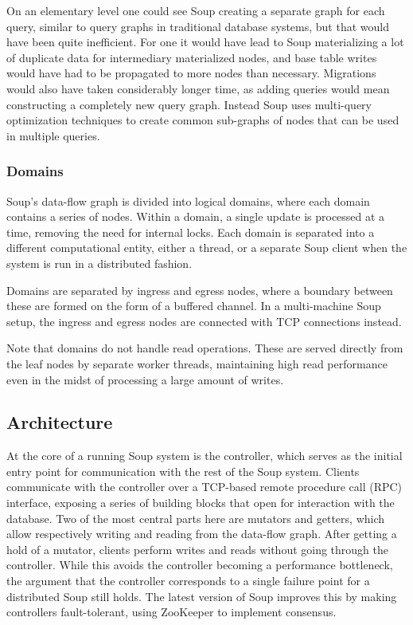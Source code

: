 \documentclass[b5paper]{report}
\begin{document}
On an elementary level one could see Soup creating a separate graph for each
query, similar to query graphs in traditional database systems, but that would
have been quite inefficient. For one it would have lead to Soup materializing a
lot of duplicate data for intermediary materialized nodes, and base table writes
would have had to be propagated to more nodes than necessary. Migrations would
also have taken considerably longer time, as adding queries would mean
constructing a completely new query graph. Instead Soup uses multi-query
optimization techniques to create common sub-graphs of nodes that can be used in
multiple queries.

\subsubsection{Domains}
Soup's data-flow graph is divided into logical domains, where each domain
contains a series of nodes. Within a domain, a single update is processed at a
time, removing the need for internal locks. Each domain is separated into a
different computational entity, either a thread, or a separate Soup client when
the system is run in a distributed fashion.

Domains are separated by ingress and egress nodes, where a boundary between
these are formed on the form of a buffered channel. In a multi-machine Soup
setup, the ingress and egress nodes are connected with TCP connections instead.

Note that domains do not handle read operations. These are served directly from
the leaf nodes by separate worker threads, maintaining high read performance
even in the midst of processing a large amount of writes.

\subsection{Architecture}
At the core of a running Soup system is the controller, which serves as the
initial entry point for communication with the rest of the Soup system. Clients
communicate with the controller over a TCP-based remote procedure call (RPC)
interface, exposing a series of building blocks that open for interaction with
the database. Two of the most central parts here are mutators and getters, which
allow respectively writing and reading from the data-flow graph. After getting a
hold of a mutator, clients perform writes and reads without going through the
controller. While this avoids the controller becoming a performance bottleneck,
the argument that the controller corresponds to a single failure point for a
distributed Soup still holds. The latest version of Soup improves this by making
controllers fault-tolerant, using ZooKeeper \cite{zookeeper} to implement
consensus.
\end{document}
